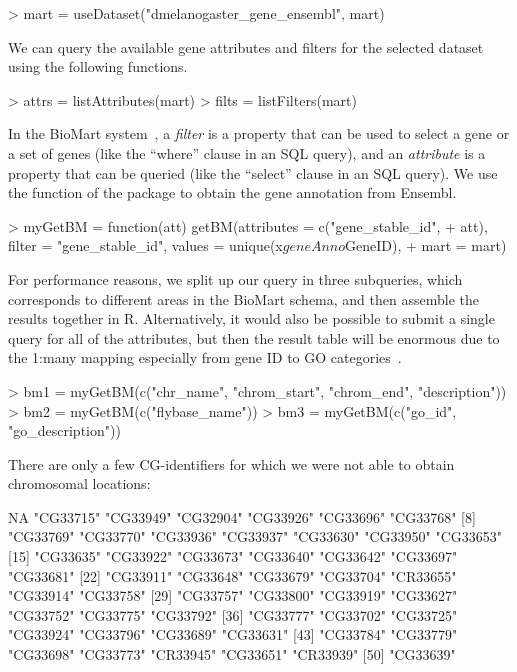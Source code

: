 %
\begin{Schunk}
\begin{Sinput}
> mart = useDataset("dmelanogaster_gene_ensembl", mart)
\end{Sinput}
\end{Schunk}
%
We can query the available gene attributes and filters for the
selected dataset using the following functions.
\begin{Schunk}
\begin{Sinput}
> attrs = listAttributes(mart)
> filts = listFilters(mart)
\end{Sinput}
\end{Schunk}
%
In the BioMart system~\cite{Kasprzyk2004}, a \emph{filter} is a
property that can be used to select a gene or a set of genes (like the
``where'' clause in an SQL query), and an \emph{attribute} is a
property that can be queried (like the ``select'' clause in an SQL
query). We use the  function of the package
 to obtain the gene annotation from Ensembl.
%
\begin{Schunk}
\begin{Sinput}
> myGetBM = function(att) getBM(attributes = c("gene_stable_id", 
+     att), filter = "gene_stable_id", values = unique(x$geneAnno$GeneID), 
+     mart = mart)
\end{Sinput}
\end{Schunk}
% 
For performance reasons, we split up our query in three subqueries,
which corresponds to different areas in the BioMart schema, and then
assemble the results together in R.  Alternatively, it would also be
possible to submit a single query for all of the attributes, but then
the result table will be enormous due to the 1:many mapping
especially from gene ID to GO categories~\cite{GO}.
%
\begin{Schunk}
\begin{Sinput}
> bm1 = myGetBM(c("chr_name", "chrom_start", "chrom_end", "description"))
> bm2 = myGetBM(c("flybase_name"))
> bm3 = myGetBM(c("go_id", "go_description"))
\end{Sinput}
\end{Schunk}
%
There are only a few CG-identifiers for which we were not able to
obtain chromosomal locations: 
%
\begin{Schunk}
\begin{Soutput}
 [1] NA        "CG33715" "CG33949" "CG32904" "CG33926" "CG33696" "CG33768"
 [8] "CG33769" "CG33770" "CG33936" "CG33937" "CG33630" "CG33950" "CG33653"
[15] "CG33635" "CG33922" "CG33673" "CG33640" "CG33642" "CG33697" "CG33681"
[22] "CG33911" "CG33648" "CG33679" "CG33704" "CR33655" "CG33914" "CG33758"
[29] "CG33757" "CG33800" "CG33919" "CG33627" "CG33752" "CG33775" "CG33792"
[36] "CG33777" "CG33702" "CG33725" "CG33924" "CG33796" "CG33689" "CG33631"
[43] "CG33784" "CG33779" "CG33698" "CG33773" "CR33945" "CG33651" "CR33939"
[50] "CG33639"
\end{Soutput}
\end{Schunk}
